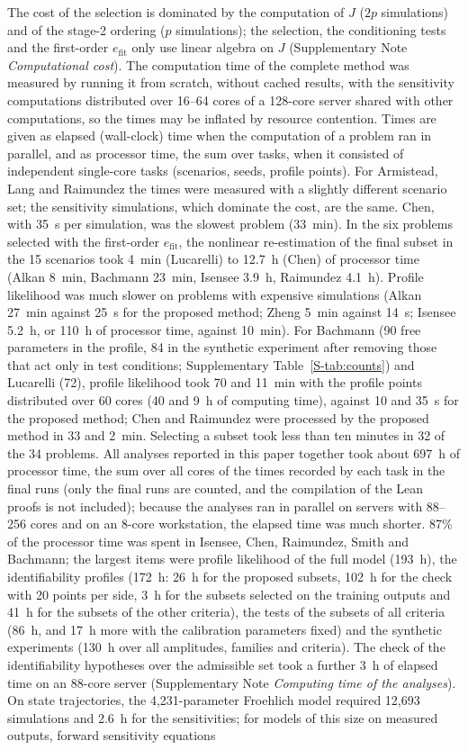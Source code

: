 \documentclass[pdflatex,sn-nature]{sn-jnl}
\theoremstyle{plain}
\begin{document}
The cost of the selection is dominated by the computation of $J$ ($2p$ simulations) and of the stage-2 ordering ($p$ simulations); the selection, the conditioning tests and the first-order $e_{\mathrm{fit}}$ only use linear algebra on $J$ (Supplementary Note \textit{Computational cost}). The computation time of the complete method was measured by running it from scratch, without cached results, with the sensitivity computations distributed over 16--64 cores of a 128-core server shared with other computations, so the times may be inflated by resource contention. Times are given as elapsed (wall-clock) time when the computation of a problem ran in parallel, and as processor time, the sum over tasks, when it consisted of independent single-core tasks (scenarios, seeds, profile points). For Armistead, Lang and Raimundez the times were measured with a slightly different scenario set; the sensitivity simulations, which dominate the cost, are the same. Chen, with 35~s per simulation, was the slowest problem (33~min). In the six problems selected with the first-order $e_{\mathrm{fit}}$, the nonlinear re-estimation of the final subset in the 15 scenarios took 4~min (Lucarelli) to 12.7~h (Chen) of processor time (Alkan 8~min, Bachmann 23~min, Isensee 3.9~h, Raimundez 4.1~h). Profile likelihood was much slower on problems with expensive simulations (Alkan 27~min against 25~s for the proposed method; Zheng 5~min against 14~s; Isensee 5.2~h, or 110~h of processor time, against 10~min). For Bachmann (90 free parameters in the profile, 84 in the synthetic experiment after removing those that act only in test conditions; Supplementary Table~\ref{S-tab:counts}) and Lucarelli (72), profile likelihood took 70 and 11~min with the profile points distributed over 60 cores (40 and 9~h of computing time), against 10 and 35~s for the proposed method; Chen and Raimundez were processed by the proposed method in 33 and 2~min. Selecting a subset took less than ten minutes in 32 of the 34 problems. All analyses reported in this paper together took about 697~h of processor time, the sum over all cores of the times recorded by each task in the final runs (only the final runs are counted, and the compilation of the Lean proofs is not included); because the analyses ran in parallel on servers with 88--256 cores and on an 8-core workstation, the elapsed time was much shorter. 87\% of the processor time was spent in Isensee, Chen, Raimundez, Smith and Bachmann; the largest items were profile likelihood of the full model (193~h), the identifiability profiles (172~h: 26~h for the proposed subsets, 102~h for the check with 20 points per side, 3~h for the subsets selected on the training outputs and 41~h for the subsets of the other criteria), the tests of the subsets of all criteria (86~h, and 17~h more with the calibration parameters fixed) and the synthetic experiments (130~h over all amplitudes, families and criteria). The check of the identifiability hypotheses over the admissible set took a further 3~h of elapsed time on an 88-core server (Supplementary Note \textit{Computing time of the analyses}). On state trajectories, the 4,231-parameter Froehlich model required 12,693 simulations and 2.6~h for the sensitivities; for models of this size on measured outputs, forward sensitivity equations\cite{bib13} 
\end{document}

